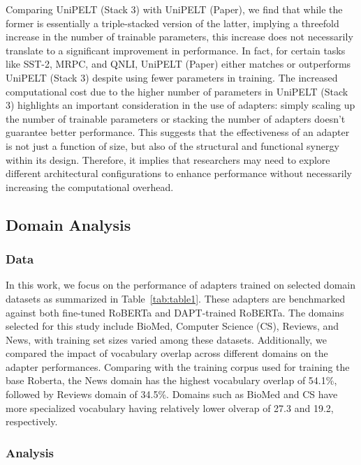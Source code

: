 \documentclass[10pt,twocolumn,letterpaper]{article}
\begin{document}
Comparing UniPELT (Stack 3) with UniPELT (Paper), we find that while the former is essentially a triple-stacked version of the latter, implying a threefold increase in the number of trainable parameters, this increase does not necessarily translate to a significant improvement in performance. In fact, for certain tasks like SST-2, MRPC, and QNLI, UniPELT (Paper) either matches or outperforms UniPELT (Stack 3) despite using fewer parameters in training. The increased computational cost due to the higher number of parameters in UniPELT (Stack 3) highlights an important consideration in the use of adapters: simply scaling up the number of trainable parameters or stacking the number of adapters doesn't guarantee better performance. This suggests that the effectiveness of an adapter is not just a function of size, but also of the structural and functional synergy within its design. Therefore, it implies that researchers may need to explore different architectural configurations to enhance performance without necessarily increasing the computational overhead.


\subsection{Domain Analysis} 
\subsubsection{Data}
In this work, we focus on the performance of adapters trained on selected domain datasets as summarized in Table~\ref{tab:table1}. These adapters are benchmarked against both fine-tuned RoBERTa and DAPT-trained RoBERTa. The domains selected for this study include BioMed, Computer Science (CS), Reviews, and News, with training set sizes varied among these datasets. Additionally, we compared the impact of vocabulary overlap across different domains on the adapter performances. Comparing with the training corpus used for training the base Roberta, the News domain has the highest vocabulary overlap of 54.1\%, followed by Reviews domain of 34.5\%. Domains such as BioMed and CS have more specialized vocabulary having relatively lower olverap of 27.3 and 19.2, respectively.    

\subsubsection{Analysis}
\end{document}
